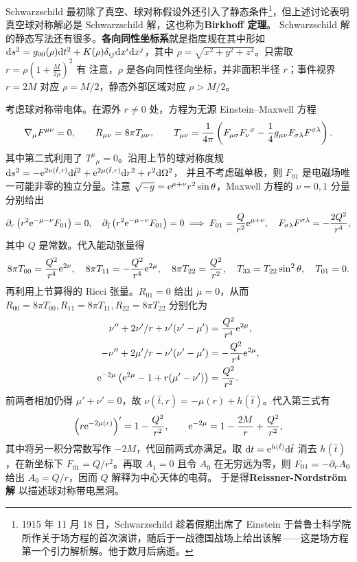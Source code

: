 Schwarzschild 最初除了真空、球对称假设外还引入了静态条件\footnote{1915 年 11 月 18 日，Schwarzschild 趁着假期出席了 Einstein 于普鲁士科学院所作关于场方程的首次演讲，随后于一战德国战场上给出该解——这是场方程第一个引力解析解。他于数月后病逝。}，但上述讨论表明真空球对称解必是 Schwarzschild 解，这也称为\textbf{Birkhoff 定理}。
Schwarzschild 解的静态写法还有很多。\textbf{各向同性坐标系}就是指度规在其中形如 $\dd s^2=g_{00}(\rho)\dd t^2+K(\rho)\delta_{ij}\dd x^i\dd x^j$，其中 $\rho=\sqrt{x^2+y^2+z^2}$。只需取 $r=\rho(1+\frac{M}{2\rho})^2$ 有
注意，$\rho$ 是各向同性径向坐标，并非面积半径 $r$；事件视界 $r=2M$ 对应 $\rho=M/2$，静态外部区域对应 $\rho>M/2$。

考虑球对称带电体。在源外 $r\ne0$ 处，方程为无源 Einstein--Maxwell 方程
\[
    \nabla_\mu F^{\mu\nu}=0,\qquad R_{\mu\nu}=8\pi T_{\mu\nu},\qquad
    T_{\mu\nu}=\frac{1}{4\pi}\left(F_{\mu\sigma}F_\nu{}^\sigma-\frac14g_{\mu\nu}F_{\sigma\lambda}F^{\sigma\lambda}\right).
\]
其中第二式利用了 $T^\mu{}_\mu=0$。沿用上节的球对称度规 $\dd s^2=-\mathrm{e}^{2\nu(\hat t,r)}\dd\hat t^2+\mathrm{e}^{2\mu(\hat t,r)}\dd r^2+r^2\dd\Omega^2$，
并且不考虑磁单极，则 $F_{01}$ 是电磁场唯一可能非零的独立分量。注意 $\sqrt{-g}=\mathrm{e}^{\mu+\nu}r^2\sin\theta$，Maxwell 方程的 $\nu=0,1$ 分量分别给出
\[
    \partial_r\left(r^2\mathrm{e}^{-\mu-\nu}F_{01}\right)=0,\quad
    \partial_{\hat t}\left(r^2\mathrm{e}^{-\mu-\nu}F_{01}\right)=0\implies
    F_{01}=\frac{Q}{r^2}\mathrm{e}^{\mu+\nu},\quad F_{\sigma\lambda}F^{\sigma\lambda}=-\frac{2Q^2}{r^4},
\]
其中 $Q$ 是常数。代入能动张量得
\[
    8\pi T_{00}=\frac{Q^2}{r^4}\mathrm{e}^{2\nu},\quad
    8\pi T_{11}=-\frac{Q^2}{r^4}\mathrm{e}^{2\mu},\quad
    8\pi T_{22}=\frac{Q^2}{r^2},\quad
    T_{33}=T_{22}\sin^2\theta,\quad T_{01}=0.
\]
再利用上节算得的 Ricci 张量。$R_{01}=0$ 给出 $\dot\mu=0$，从而 $R_{00}=8\pi T_{00},R_{11}=8\pi T_{11},R_{22}=8\pi T_{22}$ 分别化为
\begin{align*}
    \nu''+2\nu'/r+\nu'(\nu'-\mu')&=\frac{Q^2}{r^4}\mathrm{e}^{2\mu},\\
    -\nu''+2\mu'/r-\nu'(\nu'-\mu')&=-\frac{Q^2}{r^4}\mathrm{e}^{2\mu},\\
    \mathrm{e}^{-2\mu}\left(\mathrm{e}^{2\mu}-1+r(\mu'-\nu')\right)&=\frac{Q^2}{r^2}.
\end{align*}
前两者相加仍得 $\mu'+\nu'=0$，故 $\nu(\hat t,r)=-\mu(r)+h(\hat t)$。代入第三式有
\[
    \left(r\mathrm{e}^{-2\mu(r)}\right)'=1-\frac{Q^2}{r^2},\qquad
    \mathrm{e}^{-2\mu}=1-\frac{2M}{r}+\frac{Q^2}{r^2},
\]
其中将另一积分常数写作 $-2M$，代回前两式亦满足。取 $\dd t=\mathrm{e}^{h(\hat t)}\dd\hat t$ 消去 $h(\hat t)$，在新坐标下 $F_{01}=Q/r^2$。再取 $A_1=0$ 且令 $A_0$ 在无穷远为零，则 $F_{01}=-\partial_rA_0$ 给出 $A_0=Q/r$，因而 $Q$ 解释为中心天体的电荷。
于是得\textbf{Reissner-Nordström 解}
以描述球对称带电黑洞。

